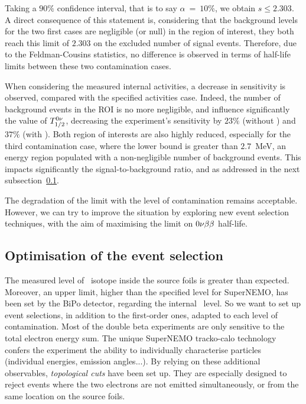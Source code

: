 Taking a $90\%$ confidence interval, that is to say $\alpha~=~10\%$, we obtain $s \leq 2.303$.
A direct consequence of this statement is, considering that the background levels for the two first cases are negligible (or null) in the region of interest, they both reach this limit of $2.303$ on the excluded number of signal events.
Therefore, due to the Feldman-Cousins statistics, no difference is observed in terms of half-life limits between these two contamination cases.

When considering the measured internal activities, a decrease in sensitivity is observed, compared with the specified activities case.
Indeed, the number of background events in the ROI is no more negligible, and influence significantly the value of $T_{1/2}^{0\nu}$, decreasing the experiment's sensitivity by $23\%$ (without \Bi) and $37\%$ (with \Bi).
Both region of interests are also highly reduced, especially for the third contamination case, where the lower bound is greater than $2.7$~MeV, an energy region populated with a non-negligible number of background events.
This impacts significantly the signal-to-background ratio, and as addressed in the next subsection~\ref{subsec:opti_ev_selection}.

The degradation of the limit with the level of contamination remains acceptable.
However, we can try to improve the situation by exploring new event selection techniques, with the aim of maximising the limit on $0\nu\beta\beta$ half-life.

\subsection{Optimisation of the event selection}
\label{subsec:opti_ev_selection}

The measured level of \Tl\ isotope inside the source foils is greater than expected.
Moreover, an upper limit, higher than the specified level for SuperNEMO, has been set by the BiPo detector, regarding the internal \Bi\ level.
So we want to set up event selections, in addition to the first-order ones, adapted to each level of contamination.
Most of the double beta experiments are only sensitive to the total electron energy sum.
The unique SuperNEMO tracko-calo technology confers the experiment the ability to individually characterise particles (individual energies, emission angles...).
By relying on these additional observables, \emph{topological cuts} have been set up.
They are especially designed to reject events where the two electrons are not emitted simultaneously, or from the same location on the source foils.


